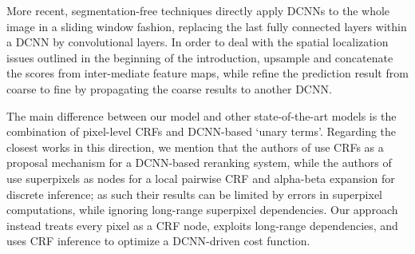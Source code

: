 
More recent, segmentation-free techniques \citet{long2014fully, eigen2014predicting} directly apply DCNNs to the whole image in a sliding window fashion, replacing the last fully connected layers within a DCNN  by convolutional layers. In order to deal with the spatial localization issues outlined in the beginning of the introduction, \citet{long2014fully} upsample and concatenate the scores from inter-mediate feature maps, while \citet{eigen2014predicting} refine the prediction result from coarse to fine by propagating the coarse results to another DCNN. 


The main difference between our model and other state-of-the-art models is the combination of pixel-level CRFs and DCNN-based `unary terms'. Regarding the closest    works in this direction, we mention that  the authors of \citet{cogswell2014combining} use CRFs as a proposal mechanism for a DCNN-based reranking system, while the authors of  
\citet{farabet2013learning} use superpixels as  nodes for a local pairwise CRF and alpha-beta expansion for discrete inference; as such their results can be limited by errors in superpixel computations, while ignoring  long-range superpixel dependencies. Our approach instead treats every pixel as a CRF node, exploits long-range dependencies, and uses  CRF inference to optimize a DCNN-driven cost function. 









